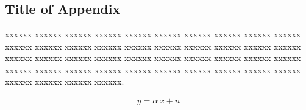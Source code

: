 
	\chapter{}
	\label{appendix0}
		\graphicspath{{Appendices/Vector/}{Appendices/}}
\section*{Title of Appendix}

xxxxxx xxxxxx xxxxxx xxxxxx xxxxxx xxxxxx xxxxxx xxxxxx xxxxxx xxxxxx xxxxxx xxxxxx xxxxxx xxxxxx xxxxxx xxxxxx xxxxxx xxxxxx xxxxxx xxxxxx xxxxxx xxxxxx xxxxxx xxxxxx xxxxxx xxxxxx xxxxxx xxxxxx xxxxxx xxxxxx xxxxxx xxxxxx xxxxxx xxxxxx xxxxxx xxxxxx xxxxxx xxxxxx xxxxxx xxxxxx xxxxxx xxxxxx xxxxxx xxxxxx.

\begin{align}
y=\alpha\,x+n
\end{align} 